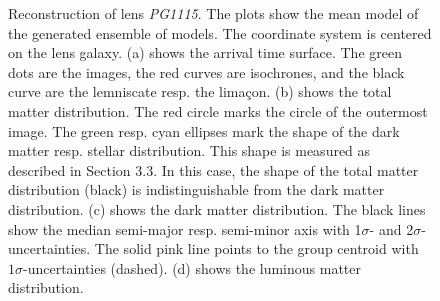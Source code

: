 \documentclass[useAMS,usenatbib]{mn2e}
\begin{document}
\begin{figure}
\begin{center}
  \caption{Reconstruction of lens \textit{PG1115}. The plots show the mean model of the generated ensemble of models. The coordinate system is centered on the lens galaxy. (a) shows the arrival time surface. The green dots are the images, the red curves are isochrones, and the black curve are the lemniscate resp. the lima\c{c}on. (b) shows the total matter distribution. The red circle marks the circle of the outermost image. The green resp. cyan ellipses mark the shape of the dark matter resp. stellar distribution. This shape is measured as described in Section 3.3. In this case, the shape of the total matter distribution (black) is indistinguishable from the dark matter distribution. (c) shows the dark matter distribution. The black lines show the median semi-major resp. semi-minor axis with 1$\sigma$- and 2$\sigma$- uncertainties. The solid pink line points to the group centroid with $1\sigma$-uncertainties (dashed). (d) shows the luminous matter distribution.}
  \label{fig:1115rec}
 \end{center}
\end{figure}
\end{document}

